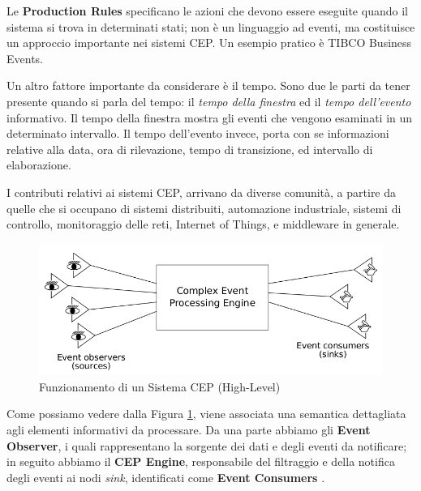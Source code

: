 \documentclass[12pt]{article}
\begin{document}
Le \textbf{Production Rules} specificano le azioni che devono essere eseguite quando il sistema si trova in determinati stati; non è un linguaggio ad eventi, ma costituisce un approccio importante nei sistemi CEP. Un esempio pratico è TIBCO Business Events.

Un altro fattore importante da considerare è il tempo. Sono due le parti da tener presente quando si parla del tempo: il \textit{tempo della finestra} ed il \textit{tempo dell'evento} informativo. Il tempo della finestra mostra gli eventi che vengono esaminati in un determinato intervallo. Il tempo dell'evento invece, porta con se informazioni relative alla data, ora di rilevazione, tempo di transizione, ed intervallo di elaborazione.

I contributi relativi ai sistemi CEP, arrivano da diverse comunità, a partire da quelle che si occupano di sistemi distribuiti, automazione industriale, sistemi di controllo, monitoraggio delle reti, Internet of Things, e middleware in generale.

\begin{figure}[H]
	\centering
	\includegraphics[scale=0.40]{images/CEP.png}
	\caption{Funzionamento di un Sistema CEP (High-Level) \cite{Cugola:2012:PFI:2187671.2187677}}
	\label{funcep}
\end{figure}

Come possiamo vedere dalla Figura \ref{funcep}, viene associata una semantica dettagliata agli elementi informativi da processare. Da una parte abbiamo gli \textbf{Event Observer}, i quali rappresentano la sorgente dei dati e degli eventi da notificare; in seguito abbiamo il \textbf{CEP Engine}, responsabile del filtraggio e della notifica degli eventi ai nodi \textit{sink}, identificati come \textbf{Event Consumers} \cite{Cugola:2012:PFI:2187671.2187677,fulop2010survey}.
\end{document}
